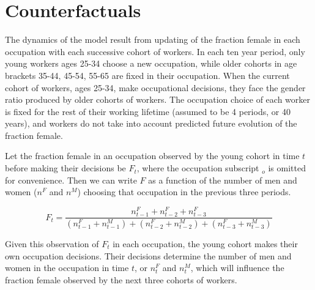 \documentclass[12pt]{article}
\begin{document}

\section{Counterfactuals} \label{counterfactuals}
The dynamics of the model result from updating of the fraction female in each occupation with each successive cohort of workers. In each ten year period, only young workers ages 25-34 choose a new occupation, while older cohorts in age brackets 35-44, 45-54, 55-65 are fixed in their occupation. When the current cohort of workers, ages 25-34, make occupational decisions, they face the gender ratio produced by older cohorts of workers. The occupation choice of each worker is fixed for the rest of their working lifetime (assumed to be 4 periods, or 40 years), and workers do not take into account predicted future evolution of the fraction female. 



Let the fraction female in an occupation observed by the young cohort in time $t$ before making their decisions be $F_t$, where the occupation subscript $_o$ is omitted for convenience. Then we can write $F$ as a function of the number of men and women ($n^F$ and $n^M$) choosing that occupation in the previous three periods.


$$F_t = \frac{n^F_{t-1} + n^F_{t-2} + n^F_{t-3}}{(n^F_{t-1} + n^M_{t-1}) + (n^F_{t-2} + n^M_{t-2}) + (n^F_{t-3} + n^M_{t-3}) } $$

Given this observation of $F_t$ in each occupation, the young cohort makes their own occupation decisions. Their decisions determine the number of men and women in the occupation in time $t$, or $n^F_t$ and $n^M_t$, which will influence the fraction female observed by the next three cohorts of workers.
\end{document}
